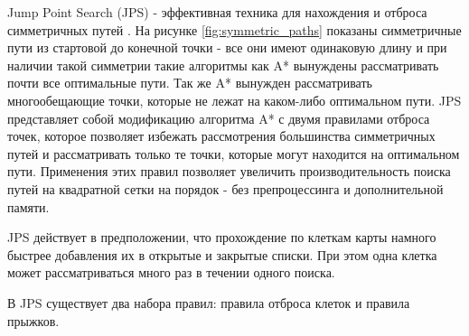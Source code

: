Jump Point Search (JPS) - эффективная техника для нахождения и отброса симметричных путей \cite{IMPROVING_JPS}. На рисунке \ref{fig:symmetric_paths} показаны симметричные пути из стартовой до конечной точки - все они имеют одинаковую длину и при наличии такой симметрии такие алгоритмы как A* вынуждены рассматривать почти все оптимальные пути. Так же A* вынужден рассматривать многообещающие точки, которые не лежат на каком-либо оптимальном пути. JPS представляет собой модификацию алгоритма A* с двумя правилами отброса точек, которое позволяет избежать рассмотрения большинства симметричных путей и рассматривать только те точки, которые могут находится на оптимальном пути. Применения этих правил позволяет увеличить производительность поиска путей на квадратной сетки на порядок - без препроцессинга и дополнительной памяти.

{
	\mybox[x=1,y=1,color=green]
	\mybox[x=4,y=4,color=green]
	
	\mygrid[width=6, height=6]
	
	\myarrow[startx=1,starty=1,endx=1,endy=2,color=blue]
	\myarrow[startx=1,starty=2,endx=1,endy=3,color=blue]
	\myarrow[startx=1,starty=3,endx=1,endy=4,color=blue]
	\myarrow[startx=1,starty=4,endx=2,endy=4,color=blue]
	\myarrow[startx=2,starty=4,endx=3,endy=4,color=blue]
	\myarrow[startx=3,starty=4,endx=4,endy=4,color=blue]
	
	\myarrow[startx=4,starty=1,endx=4,endy=2,color=orange]
	\myarrow[startx=4,starty=2,endx=4,endy=3,color=orange]
	\myarrow[startx=4,starty=3,endx=4,endy=4,color=orange]
	\myarrow[startx=1,starty=1,endx=2,endy=1,color=orange]
	\myarrow[startx=2,starty=1,endx=3,endy=1,color=orange]
	\myarrow[startx=3,starty=1,endx=4,endy=1,color=orange]
	
	\myarrow[startx=1,starty=2,endx=2,endy=2,color=red]
	\myarrow[startx=2,starty=2,endx=3,endy=2,color=red]
	\myarrow[startx=3,starty=2,endx=4,endy=2,color=red]
	
	\myarrow[startx=1,starty=3,endx=2,endy=3,color=yellow]
	\myarrow[startx=2,starty=3,endx=3,endy=3,color=yellow]
	\myarrow[startx=3,starty=3,endx=4,endy=3,color=yellow]
}


JPS действует в предположении, что прохождение по клеткам карты намного быстрее добавления их в открытые и закрытые списки. При этом одна клетка может рассматриваться много раз в течении одного поиска.

В JPS существует два набора правил: правила отброса клеток и правила прыжков.

